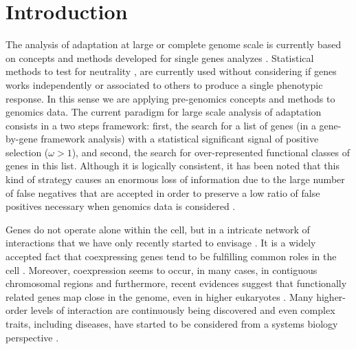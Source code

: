 

\section{Introduction}

The analysis of adaptation at large or complete genome scale is currently based on concepts and methods developed for single genes analyzes \cite{Arbiza2006,Bakewell2007,Bustamante2005,Clark2003,Nielsen2005}. Statistical methods to test for neutrality \cite{Nielsen2001}, are currently used without considering if genes works independently or associated to others to produce a single phenotypic response. In this sense we are applying pre-genomics concepts and methods to genomics data. The current paradigm for large scale analysis of adaptation consists in a two steps framework: first, the search for a list of genes (in a gene-by-gene framework analysis) with a statistical significant signal of positive selection ($\omega > 1$), and second, the search for over-represented functional classes of genes in this list. Although it is logically consistent, it has been noted that this kind of strategy causes an enormous loss of information due to the large number of false negatives that are accepted in order to preserve a low ratio of false positives necessary when genomics data is considered \cite{Al-Shahrour2007,Al-Shahrour2005a,Al-Shahrour2006,Subramanian2005}.

Genes do not operate alone within the cell, but in a intricate network of interactions that we have only recently started to envisage \cite{Stelzl2005}. It is a widely accepted fact that coexpressing genes tend to be fulfilling common roles in the cell \cite{Lee2003}. Moreover, coexpression seems to occur, in many cases, in contiguous chromosomal regions \cite{Caron2001} and furthermore, recent evidences suggest that functionally related genes map close in the genome, even in higher eukaryotes \cite{Hurst2004}. Many higher-order levels of interaction are continuously being discovered and even complex traits, including diseases, have started to be considered from a systems biology perspective \cite{Ideker2008}.

